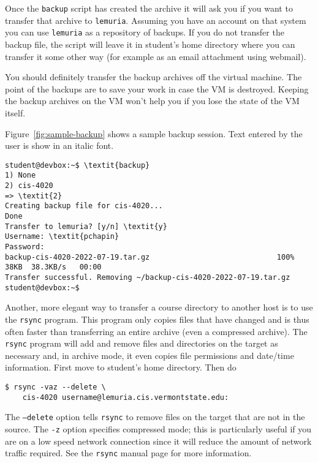 \documentclass[twocolumn]{article}
\begin{document}
Once the \texttt{backup} script has created the archive it will ask you if you want to transfer
that archive to \texttt{lemuria}. Assuming you have an account on that system you can use
\texttt{lemuria} as a repository of backups. If you do not transfer the backup file, the script
will leave it in student's home directory where you can transfer it some other way (for example
as an email attachment using webmail).

You should definitely transfer the backup archives off the virtual machine. The point of the
backups are to save your work in case the VM is destroyed. Keeping the backup archives on the VM
won't help you if you lose the state of the VM itself.

Figure~\ref{fig:sample-backup} shows a sample backup session. Text entered by the user is show
in an italic font.

\begin{figure*}[t]
\begin{Verbatim}[fontsize=\small, frame=single, commandchars=\\\{\}]
student@devbox:~$ \textit{backup}
1) None
2) cis-4020
=> \textit{2}
Creating backup file for cis-4020...
Done
Transfer to lemuria? [y/n] \textit{y}
Username: \textit{pchapin}
Password: 
backup-cis-4020-2022-07-19.tar.gz                             100%   38KB  38.3KB/s   00:00    
Transfer successful. Removing ~/backup-cis-4020-2022-07-19.tar.gz
student@devbox:~$
\end{Verbatim}
\caption{Sample Backup Session}
\label{fig:sample-backup}
\end{figure*}

Another, more elegant way to transfer a course directory to another host is to use the
\texttt{rsync} program. This program only copies files that have changed and is thus often
faster than transferring an entire archive (even a compressed archive). The \texttt{rsync}
program will add and remove files and directories on the target as necessary and, in archive
mode, it even copies file permissions and date/time information. First move to student's home
directory. Then do
\begin{Verbatim}
$ rsync -vaz --delete \
    cis-4020 username@lemuria.cis.vermontstate.edu:
\end{Verbatim}

The \texttt{--delete} option tells \texttt{rsync} to remove files on the target that are not in
the source. The \texttt{-z} option specifies compressed mode; this is particularly useful if you
are on a low speed network connection since it will reduce the amount of network traffic
required. See the \texttt{rsync} manual page for more information.
\end{document}
